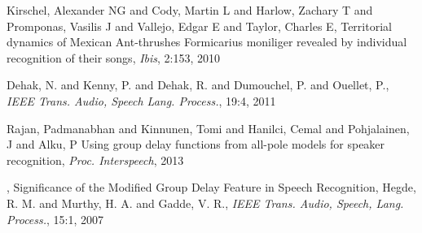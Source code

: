 \documentclass{article}
\begin{document}
\begin{thebibliography}{100}
Kirschel, Alexander NG and Cody, Martin L and Harlow, Zachary T and Promponas,
Vasilis J and Vallejo, Edgar E and Taylor, Charles E,
Territorial dynamics of Mexican Ant-thrushes Formicarius moniliger revealed by
individual recognition of their songs, \emph{Ibis}, 2:153, 2010

Dehak, N. and Kenny, P. and Dehak, R. and Dumouchel, P. and Ouellet, P.,
\emph{IEEE Trans. Audio, Speech Lang. Process.}, 19:4, 2011

Rajan, Padmanabhan and Kinnunen, Tomi and Hanilci, Cemal and Pohjalainen, J and Alku, P
Using group delay functions from all-pole models for speaker recognition,
\emph{Proc. Interspeech}, 2013

,
Significance of the Modified Group Delay Feature in Speech Recognition,
Hegde, R. M. and Murthy, H. A. and Gadde, V. R.,
\emph{IEEE Trans. Audio, Speech, Lang. Process.},
15:1, 2007

\end{thebibliography}
    
\end{document}
